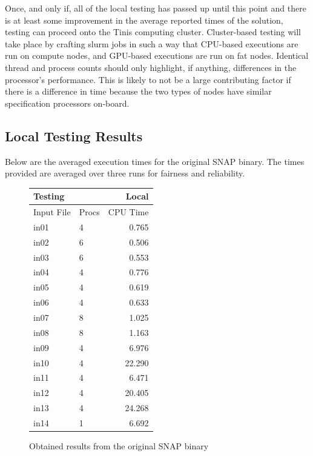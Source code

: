 \documentclass[conference]{IEEEtran}
\begin{document}
Once, and only if, all of the local testing has passed up until this point and there is at least some improvement in the average reported times of the solution, testing can proceed onto the Tinis computing cluster. Cluster-based testing will take place by crafting slurm jobs in such a way that CPU-based executions are run on compute nodes, and GPU-based executions are run on fat nodes. Identical thread and process counts should only highlight, if anything, differences in the processor's performance. This is likely to not be a large contributing factor if there is a difference in time because the two types of nodes have similar specification processors on-board.


\subsection{Local Testing Results}
\label{subsec:testing_local}

Below are the averaged execution times for the original SNAP binary. The times provided are averaged over three runs for fairness and reliability.

\begin{figure}[!h]
    \centering
    \begin{tabular}{|p{0.75cm}|p{0.75cm}|r|}
        \hline
        \multicolumn{2}{|l|}{Testing} & Local \\
        \hline
        Input File & Procs & CPU Time \\
        \hline
        in01 & 4 & 0.765 \\
        \hline
        in02 & 6 & 0.506 \\
        \hline
        in03 & 6 & 0.553 \\
        \hline
        in04 & 4 & 0.776 \\
        \hline
        in05 & 4 & 0.619 \\
        \hline
        in06 & 4 & 0.633 \\
        \hline
        in07 & 8 & 1.025 \\
        \hline
        in08 & 8 & 1.163 \\
        \hline
        in09 & 4 & 6.976 \\
        \hline
        in10 & 4 & 22.290 \\
        \hline
        in11 & 4 & 6.471 \\
        \hline
        in12 & 4 & 20.405 \\
        \hline
        in13 & 4 & 24.268 \\
        \hline
        in14 & 1 & 6.692 \\
        \hline
    \end{tabular}
    \caption{Obtained results from the original SNAP binary}
    \label{table:results}
\end{figure}
\end{document}
